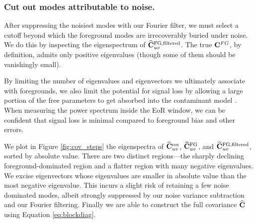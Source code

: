 
\subsubsection{Cut out modes attributable to noise.}

After suppressing the noisiest modes with our Fourier filter, we must select a cutoff beyond which the foreground modes are irrecoverably buried under noise. We do this by inspecting the eigenspectrum of $\widehat{\mathbf{C}}^\text{FG,filtered}_{uv}$. The true $\mathbf{C}^{FG}$, by definition, admits only positive eigenvalues (though some of them should be vanishingly small). 

By limiting the number of eigenvalues and eigenvectors we ultimately associate with foregrounds, we also limit the potential for signal loss by allowing a large portion of the free parameters to get absorbed into the contaminant model \cite{EricAdrianEmpiricalGlobalForegrounds,ali15}. When measuring the power spectrum inside the EoR window, we can be confident that signal loss is minimal compared to foreground bias and other errors.

We plot in Figure \ref{fig:cov_steps} the eigenspectra of $\widehat{\mathbf{C}}_{uv}^\text{res}$, $\widehat{\mathbf{C}}^\text{FG}_{uv}$, and $\widehat{\mathbf{C}}^\text{FG,filtered}_{uv}$, sorted by absolute value. There are two distinct regions---the sharply declining foreground-dominated region and a flatter region with many negative eigenvalues. We excise eigenvectors whose eigenvalues are smaller in absolute value than the most negative eigenvalue. This incurs a slight risk of retaining a few noise dominated modes, albeit strongly suppressed by our noise variance subtraction and our Fourier filtering. Finally we are able to construct the full covariance $\widehat{\mathbf{C}}$ using Equation \eqref{eq:blockdiag}.

